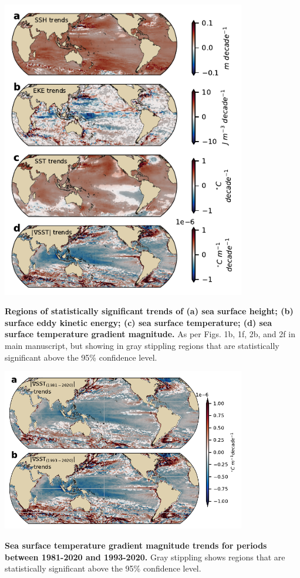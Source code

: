 \documentclass{nature}
\begin{document}
\begin{figureS}
    \centering
	\hspace{0.1\textwidth}\includegraphics[width=0.8\textwidth]{./figures/global_SST_SST_grad_SSH_trends_signif.pdf}
	\caption{\textbf{Regions of statistically significant trends of (a) sea surface height; (b) surface eddy kinetic energy; (c) sea surface temperature; (d) sea surface temperature gradient magnitude.} As per Figs. 1b, 1f, 2b, and 2f in main manuscript, but showing in gray stippling regions that are statistically significant above the 95\% confidence level. \label{fig:global_significance_trends}}
\end{figureS}


\begin{figureS}
    \centering
	\hspace{0.1\textwidth}\includegraphics[width=0.8\textwidth]{./figures/global_SST_diff_time_records.pdf}
	\caption{\textbf{Sea surface temperature gradient magnitude trends for periods between 1981-2020 and 1993-2020.} Gray stippling shows regions that are statistically significant above the 95\% confidence level. \label{fig:global_significance_trends}}
\end{figureS}
\end{document}
